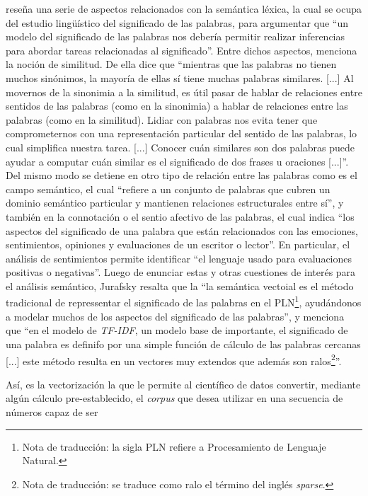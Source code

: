 reseña una serie de aspectos relacionados con la semántica léxica, la cual se ocupa
del estudio lingü\'istico del significado de las palabras, para argumentar que
``un modelo del significado de las palabras nos debería permitir realizar inferencias
para abordar tareas relacionadas al significado''. Entre dichos aspectos, menciona
la noción de similitud. De ella dice que ``mientras que las palabras no tienen muchos
sin\'onimos, la mayoría de ellas s\'i tiene muchas palabras similares. [...]
Al movernos de la sinonimia a la similitud, es \'util pasar de hablar de relaciones
entre sentidos de las palabras (como en la sinonimia) a hablar de relaciones entre las
palabras (como en la similitud). Lidiar con palabras nos evita tener que comprometernos
con una representaci\'on particular del sentido de las palabras, lo cual simplifica
nuestra tarea. [...] Conocer cuán similares son dos palabras puede ayudar a computar
cuán similar es el significado de dos frases u oraciones [...]''. Del mismo modo
se detiene en otro tipo de relaci\'on entre las palabras como es el campo
sem\'antico, el cual ``refiere a un conjunto de palabras que cubren un dominio
sem\'antico particular y mantienen relaciones estructurales entre s\'i'', y también en
la connotación o el sentio afectivo de las palabras, el cual indica ``los
aspectos del significado de una palabra que est\'an relacionados con las emociones,
sentimientos, opiniones y evaluaciones de un escritor o lector''. En particular,
el an\'alisis de sentimientos permite identificar ``el lenguaje usado para evaluaciones
positivas o negativas''. Luego de enunciar estas y otras cuestiones de interés para
el an\'alisis sem\'antico, Jurafsky resalta que la ``la semántica vectoial es el método
tradicional de repressentar el significado de las palabras en el PLN\footnote{Nota de
traducci\'on: la sigla PLN refiere a Procesamiento de Lenguaje Natural.}, ayud\'andonos
a modelar muchos de los aspectos del significado de las palabras'', y menciona que
``en el modelo de \textit{TF-IDF}, un modelo base de importante, el significado
de una palabra es definifo por una simple funci\'on de c\'alculo de las palabras
cercanas [...] este m\'etodo resulta en un vectores muy extendos que adem\'as
son ralos\footnote{Nota de traducci\'on: se traduce como ralo el t\'ermino del ingl\'es
\textit{sparse}.}''.
\par
As\'i, es la vectorizaci\'on la que le permite al cient\'ifico de datos convertir,
mediante alg\'un c\'alculo pre-establecido, el \textit{corpus} que desea
utilizar en una secuencia de n\'umeros capaz de ser
